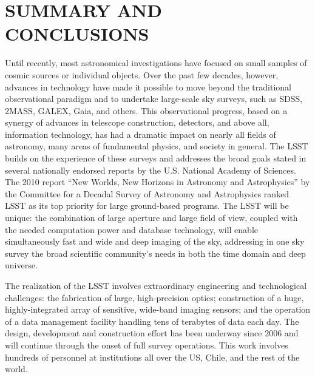 \section{SUMMARY AND CONCLUSIONS}
\label{Sec:conclusions}

Until recently, most astronomical investigations have focused on small
samples of cosmic sources or individual objects. Over the past few decades,
however, advances in technology have made it possible to move beyond the
traditional observational paradigm and to undertake large-scale sky
surveys, such as SDSS, 2MASS, GALEX, Gaia, and others. This observational
progress, based on a synergy of advances in telescope construction, detectors,
and above all, information technology, has had a dramatic impact on nearly all
fields of astronomy, many areas of fundamental physics, and society in
general. The LSST builds on the experience of these surveys and addresses
the broad goals stated in several nationally endorsed reports by the U.S.
National Academy of Sciences. The 2010 report ``New Worlds, New Horizons
in Astronomy and Astrophysics'' by the Committee for a Decadal Survey of Astronomy and
Astrophysics
ranked LSST as its top priority for large ground-based programs.
The LSST will be unique: the combination of large aperture and large field of view,
coupled with the needed computation power and database technology, will
enable simultaneously fast and wide and deep imaging of the sky, addressing in
one sky survey the broad scientific community's needs in both the
time domain and deep universe.

The realization of the LSST involves extraordinary engineering and
technological challenges: the fabrication of large, high-precision optics;
construction of a huge, highly-integrated array of sensitive, wide-band
imaging sensors; and the operation of a data management facility
handling tens of terabytes of data each day. The design, development
and construction
effort has been underway since 2006 and will continue through the
onset of full survey operations.  This work involves hundreds of
personnel at institutions all over the US, Chile, and the rest of the
world.

